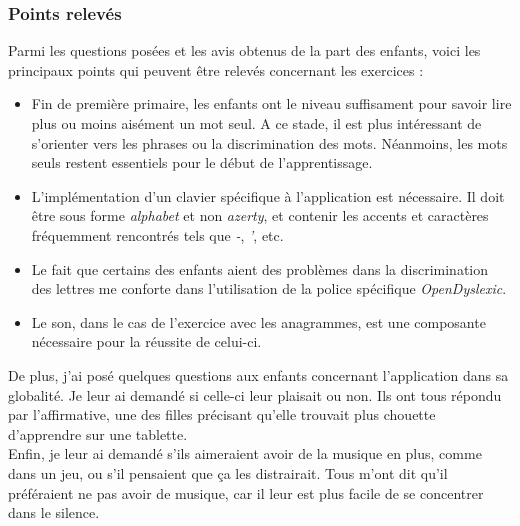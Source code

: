 \subsubsection{Points relevés}
Parmi les questions posées et les avis obtenus de la part des enfants, voici les principaux points qui peuvent être relevés concernant les exercices :
\begin{itemize}
\item Fin de première primaire, les enfants ont le niveau suffisament pour savoir lire plus ou moins aisément un mot seul. A ce stade, il est plus intéressant de s'orienter vers les phrases ou la discrimination des mots. Néanmoins, les mots seuls restent essentiels pour le début de l'apprentissage.
\item L'implémentation d'un clavier spécifique à l'application est nécessaire. Il doit être sous forme \textit{alphabet} et non \textit{azerty}, et contenir les accents et caractères fréquemment rencontrés tels que \textit{-}, \textit{'}, etc.
\item Le fait que certains des enfants aient des problèmes dans la discrimination des lettres me conforte dans l'utilisation de la police spécifique \textit{OpenDyslexic}.
\item Le son, dans le cas de l'exercice avec les anagrammes, est une composante nécessaire pour la réussite de celui-ci.\\
\end{itemize}

De plus, j'ai posé quelques questions aux enfants concernant l'application dans sa globalité. Je leur ai demandé si celle-ci leur plaisait ou non. Ils ont tous répondu par l'affirmative, une des filles précisant qu'elle trouvait plus chouette d'apprendre sur une tablette.\\
Enfin, je leur ai demandé s'ils aimeraient avoir de la musique en plus, comme dans un jeu, ou s'il pensaient que ça les distrairait. Tous m'ont dit qu'il préféraient ne pas avoir de musique, car il leur est plus facile de se concentrer dans le silence.